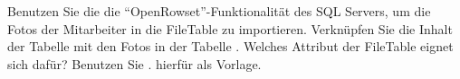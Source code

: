 \item Benutzen Sie die die \enquote{OpenRowset}-Funktionalität des SQL Servers,
um die Fotos der Mitarbeiter in die FileTable  zu importieren.
Verknüpfen Sie die Inhalt der Tabelle  mit den Fotos in
der Tabelle . Welches Attribut der FileTable eignet sich
dafür? Benutzen Sie .
hierfür als Vorlage.
\begin{literaturinternet}
  \item \cite{ms190312}
\end{literaturinternet}
